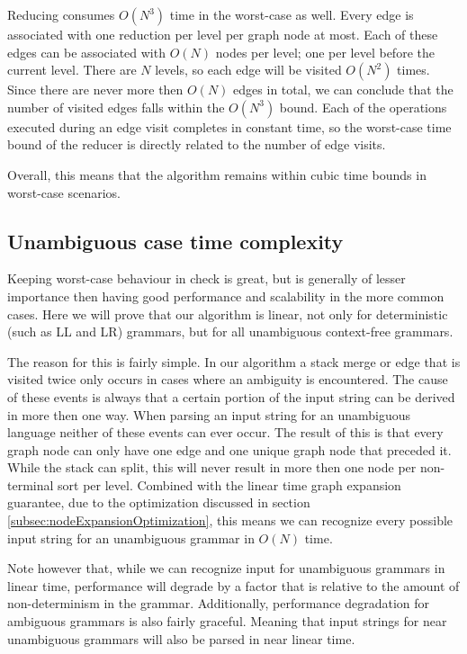 \documentclass[a4paper,10pt]{article}
\begin{document}
Reducing consumes $O(N^3)$ time in the worst-case as well. Every edge is associated with one reduction per level per graph node at most. Each of these edges can be associated with $O(N)$ nodes per level; one per level before the current level. There are $N$ levels, so each edge will be visited $O(N^2)$ times. Since there are never more then $O(N)$ edges in total, we can conclude that the number of visited edges falls within the $O(N^3)$ bound. Each of the operations executed during an edge visit completes in constant time, so the worst-case time bound of the reducer is directly related to the number of edge visits.

Overall, this means that the algorithm remains within cubic time bounds in worst-case scenarios.

\subsection{Unambiguous case time complexity}
\label{subsec:unambiguousTimeComplexity}

Keeping worst-case behaviour in check is great, but is generally of lesser importance then having good performance and scalability in the more common cases. Here we will prove that our algorithm is linear, not only for deterministic (such as LL and LR) grammars, but for all unambiguous context-free grammars.

The reason for this is fairly simple. In our algorithm a stack merge or edge that is visited twice only occurs in cases where an ambiguity is encountered. The cause of these events is always that a certain portion of the input string can be derived in more then one way. When parsing an input string for an unambiguous language neither of these events can ever occur. The result of this is that every graph node can only have one edge and one unique graph node that preceded it. While the stack can split, this will never result in more then one node per non-terminal sort per level. Combined with the linear time graph expansion guarantee, due to the optimization discussed in section \ref{subsec:nodeExpansionOptimization}, this means we can recognize every possible input string for an unambiguous grammar in $O(N)$ time.

Note however that, while we can recognize input for unambiguous grammars in linear time, performance will degrade by a factor that is relative to the amount of non-determinism in the grammar. Additionally, performance degradation for ambiguous grammars is also fairly graceful. Meaning that input strings for near unambiguous grammars will also be parsed in near linear time.
\end{document}
